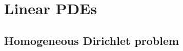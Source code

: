 

\section{\color{forestgreen(web)}Linear PDEs }



\subsection{\color{red}Homogeneous Dirichlet problem}

